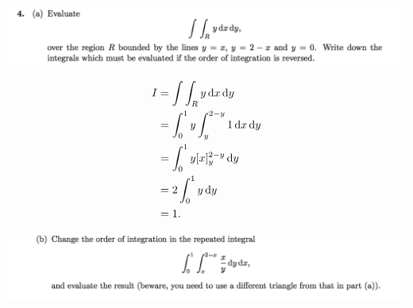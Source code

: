\documentclass[12pt]{article}
\begin{document}
\subsection{}

\begin{mdframed}
\includegraphics[width=400pt]{img/oxford-prelims-M5-multivariable-calc-1-4-a.png}
\end{mdframed}

\begin{align*}
  I &= \int\int_R y \dx \dy \\
    &= \int_0^1 y \int_y^{2-y} 1 \dx \dy \\
    &= \int_0^1 y [x]_y^{2-y} \dy \\
    &= 2\int_0^1 y \dy \\
    &= 1.
\end{align*}

\begin{mdframed}
\includegraphics[width=400pt]{img/oxford-prelims-M5-multivariable-calc-1-4-b.png}
\end{mdframed}
\end{document}
